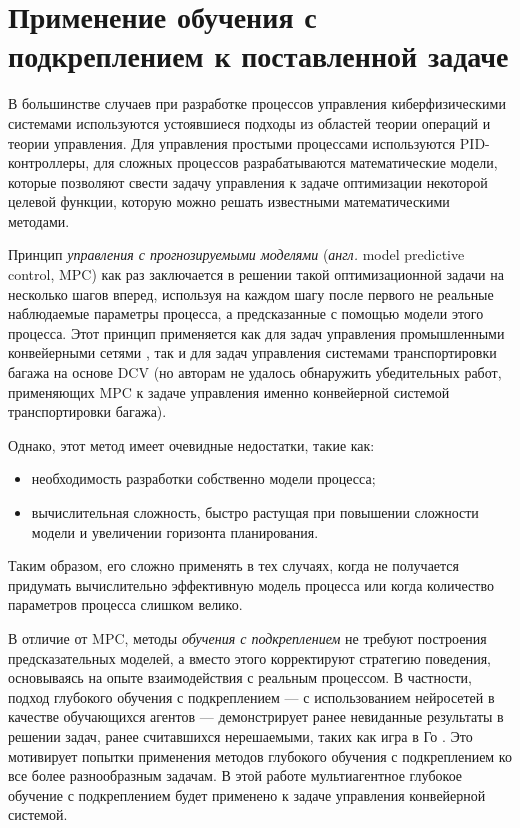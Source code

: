 \documentclass[specification,annotation,times]{itmo-student-thesis}
\theoremstyle{definition}
\begin{document}
\section{Применение обучения с подкреплением к поставленной задаче}

В большинстве случаев при разработке процессов управления киберфизическими
системами используются устоявшиеся подходы из областей теории операций и теории
управления. Для управления простыми процессами используются
PID-контроллеры\cite{aastrom2006advanced}, для сложных процессов разрабатываются
математические модели, которые позволяют свести задачу управления к задаче
оптимизации некоторой целевой функции, которую можно решать известными
математическими методами.

Принцип \textit{управления с прогнозируемыми моделями}
(\textit{англ.} model predictive control, MPC) как раз заключается в решении
такой оптимизационной задачи на несколько шагов вперед, используя на каждом шагу
после первого не реальные наблюдаемые параметры процесса, а предсказанные с
помощью модели этого процесса. Этот принцип применяется как для задач управления
промышленными конвейерными сетями \cite{cataldo2016dynamic, luo2015energy}, так
и для задач управления системами транспортировки багажа на основе DCV
\cite{tarau2010model, zeinaly2015integrated} (но авторам не удалось обнаружить
убедительных работ, применяющих MPC к задаче управления именно конвейерной
системой транспортировки багажа).

Однако, этот метод имеет очевидные недостатки, такие как:

\begin{itemize}
\item необходимость разработки собственно модели процесса;
\item вычислительная сложность, быстро растущая при повышении сложности модели и
  увеличении горизонта планирования.
\end{itemize}

Таким образом, его сложно применять в тех случаях, когда не получается придумать
вычислительно эффективную модель процесса или когда количество параметров
процесса слишком велико.

В отличие от MPC, методы \textit{обучения с подкреплением} не требуют построения
предсказательных моделей, а вместо этого корректируют стратегию поведения,
основываясь на опыте взаимодействия с реальным процессом. В частности, подход
глубокого обучения с подкреплением --- с использованием нейросетей в качестве
обучающихся агентов --- демонстрирует ранее невиданные результаты в решении
задач, ранее считавшихся нерешаемыми, таких как игра в Го
\cite{silver2016mastering}. Это мотивирует попытки применения методов глубокого
обучения с подкреплением ко все более разнообразным задачам. В этой работе
мультиагентное глубокое обучение с подкреплением будет применено к задаче
управления конвейерной системой.
\end{document}
